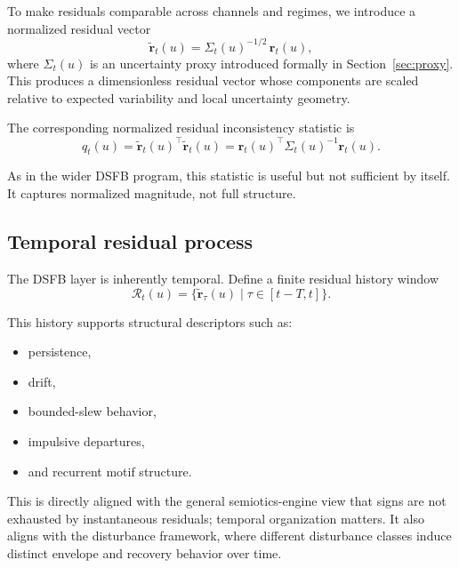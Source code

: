 \documentclass[11pt]{article}
\theoremstyle{definition}
\theoremstyle{plain}
\begin{document}
To make residuals comparable across channels and regimes, we introduce a normalized residual vector
\begin{equation}
\tilde{\mathbf r}_t(u)=\Sigma_t(u)^{-1/2}\,\mathbf r_t(u),
\end{equation}
where $\Sigma_t(u)$ is an uncertainty proxy introduced formally in Section~\ref{sec:proxy}. This produces a dimensionless residual vector whose components are scaled relative to expected variability and local uncertainty geometry.

The corresponding normalized residual inconsistency statistic is
\begin{equation}
q_t(u)=\tilde{\mathbf r}_t(u)^\top \tilde{\mathbf r}_t(u)
=
\mathbf r_t(u)^\top \Sigma_t(u)^{-1}\mathbf r_t(u).
\end{equation}

As in the wider DSFB program, this statistic is useful but not sufficient by itself. It captures normalized magnitude, not full structure.


\subsection{Temporal residual process}

The DSFB layer is inherently temporal. Define a finite residual history window
\begin{equation}
\mathcal R_t(u)=\{\tilde{\mathbf r}_\tau(u)\mid \tau\in[t-T,t]\}.
\end{equation}

This history supports structural descriptors such as:
\begin{itemize}[leftmargin=1.5em]
    \item persistence,
    \item drift,
    \item bounded-slew behavior,
    \item impulsive departures,
    \item and recurrent motif structure.
\end{itemize}

This is directly aligned with the general semiotics-engine view that signs are not exhausted by instantaneous residuals; temporal organization matters. It also aligns with the disturbance framework, where different disturbance classes induce distinct envelope and recovery behavior over time. 
\end{document}
